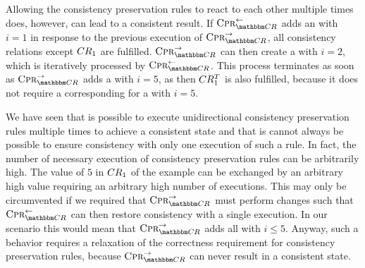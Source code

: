 Allowing the consistency preservation rules to react to each other multiple times does, however, can lead to a consistent result.
If $\consistencypreservationrule{\consistencyrelationset{CR}}^{\leftarrow}$ adds an  with $i = 1$ in response to the previous execution of $\consistencypreservationrule{\consistencyrelationset{CR}}^{\rightarrow}$, all consistency relations except $CR_{1}$ are fulfilled.
$\consistencypreservationrule{\consistencyrelationset{CR}}^{\rightarrow}$ can then create a  with $i = 2$, which is iteratively processed by $\consistencypreservationrule{\consistencyrelationset{CR}}^{\leftarrow}$.
This process terminates as soon as $\consistencypreservationrule{\consistencyrelationset{CR}}^{\rightarrow}$ adds a  with $i = 5$, as then $CR_{1}^T$ is also fulfilled, because it does not require a corresponding  for a  with $i = 5$.

We have seen that is possible to execute unidirectional consistency preservation rules multiple times to achieve a consistent state and that is cannot always be possible to ensure consistency with only one execution of such a rule.
In fact, the number of necessary execution of consistency preservation rules can be arbitrarily high.
The value of $5$ in $CR_{1}$ of the example can be exchanged by an arbitrary high value requiring an arbitrary high number of executions.
This may only be circumvented if we required that $\consistencypreservationrule{\consistencyrelationset{CR}}^{\rightarrow}$ must perform changes such that $\consistencypreservationrule{\consistencyrelationset{CR}}^{\leftarrow}$ can then restore consistency with a single execution.
In our scenario this would mean that $\consistencypreservationrule{\consistencyrelationset{CR}}^{\rightarrow}$ adds all  with $i \leq 5$.
Anyway, such a behavior requires a relaxation of the correctness requirement for consistency preservation rules, because $\consistencypreservationrule{\consistencyrelationset{CR}}^{\rightarrow}$ can never result in a consistent state.


